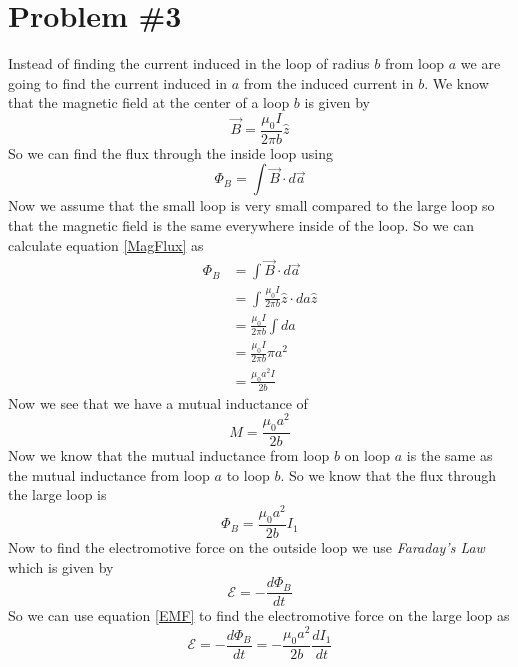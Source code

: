 \documentclass[11pt]{article}
\numberwithin{equation}{section}
\newcommand{\emf}{\mathcal{E}}
\begin{document}
\section{Problem \#3}
Instead of finding the current induced in the loop of radius $b$ from loop $a$ we are going to find the current induced in $a$ from the induced current in $b$. We know that the magnetic field at the center of a loop $b$ is given by
$$\vec{B} = \frac{\mu_0 I}{2\pi b}\hat{z}$$
So we can find the flux through the inside loop using
\begin{equation}
\Phi_B = \int \vec{B}\cdot d\vec{a}
\label{MagFlux}
\end{equation}
Now we assume that the small loop is very small compared to the large loop so that the magnetic field is the same everywhere inside of the loop. So we can calculate equation \ref{MagFlux} as
\begin{align*}
\Phi_B &= \int \vec{B}\cdot d\vec{a}\\
&= \int \frac{\mu_0 I}{2\pi b}\hat{z}\cdot da\hat{z}\\
&= \frac{\mu_0 I}{2\pi b}\int da\\
&= \frac{\mu_0 I}{2\pi b}\pi a^2\\
&= \frac{\mu_0 a^2I}{2b}
\end{align*}
Now we see that we have a mutual inductance of
$$M = \frac{\mu_0 a^2}{2b}$$
Now we know that the mutual inductance from loop $b$ on loop $a$ is the same as the mutual inductance from loop $a$ to loop $b$. So we know that the flux through the large loop is
$$\Phi_B = \frac{\mu_0 a^2}{2b} I_1$$
Now to find the electromotive force on the outside loop we use \emph{Faraday's Law} which is given by
\begin{equation}
\emf = -\frac{d\Phi_B}{dt}
\label{EMF}
\end{equation}
So we can use equation \ref{EMF} to find the electromotive force on the large loop as
$$\emf = -\frac{d\Phi_B}{dt} = -\frac{\mu_0 a^2}{2b} \frac{dI_1}{dt}$$
\end{document}
